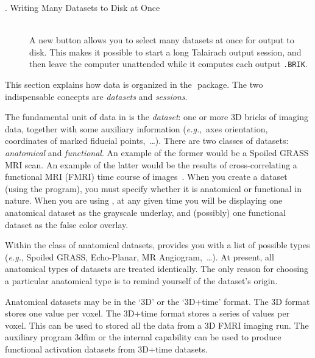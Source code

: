 \begin{description}
    \item[. Writing Many Datasets to Disk at Once]\blob\\
     A new button allows you to select many datasets at once for output to disk.
     This makes it possible to start a long Talairach output session, and
     then leave the computer unattended while it computes each output {\tt .BRIK}.


\end{description}

This section explains how data is organized in the \MCW$\!$ \afnit package.
The two indispensable concepts are {\it datasets} and {\it sessions}.

The
fundamental unit of data in \afnit is the {\it dataset\/}: one or more 3D bricks of
imaging data, together with some auxiliary information ({\it e.g.},~axes orientation,
coordinates of marked fiducial points,~\ldots).  There are two classes of
datasets: {\it anatomical\/} and {\it functional\/}.  An example of the former
would be a Spoiled GRASS MRI scan.  An example of the latter would be
the results of cross-correlating a functional MRI (FMRI) time course of
images~\cite{Bandettini}.  When you create a dataset (using the
\tothreedit program), you must specify whether it is anatomical or functional
in nature.  When you are using \afni, at any given time you will be displaying
one anatomical dataset as the grayscale underlay, and (possibly)
one functional dataset as the false color overlay.

Within the class of anatomical datasets, \tothreedit provides you with a list
of possible types ({\it e.g.}, Spoiled GRASS, Echo-Planar, MR Angiogram,~\ldots).  At present,
all anatomical types of datasets are treated identically.  The only reason
for choosing a particular anatomical type is to remind yourself of the
dataset's origin.

Anatomical
datasets may be in the `3D' or the `3D+time' format.
The 3D format stores one value per voxel.  The 3D+time format stores
a series of values per voxel.  This can be used to stored all the data
from a 3D FMRI imaging run.  The auxiliary program {\sf 3dfim} or
the internal  capability can be used to produce
functional activation datasets from 3D+time datasets.


